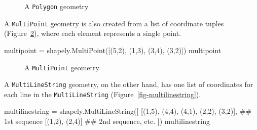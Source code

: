 \documentclass[
  letterpaper,
]{krantz}
\newenvironment{Shaded}{\begin{snugshade}}{\end{snugshade}}
\newcommand{\CommentTok}[1]{\textcolor[rgb]{0.37,0.37,0.37}{#1}}
\newcommand{\DecValTok}[1]{\textcolor[rgb]{0.68,0.00,0.00}{#1}}
\newcommand{\NormalTok}[1]{\textcolor[rgb]{0.00,0.23,0.31}{#1}}
\newcommand{\OperatorTok}[1]{\textcolor[rgb]{0.37,0.37,0.37}{#1}}
\begin{document}
\begin{figure}[H]


\caption{\label{fig-polygon}A \texttt{Polygon} geometry}

\end{figure}%

A \texttt{\textquotesingle{}MultiPoint\textquotesingle{}} geometry is
also created from a list of coordinate tuples
(Figure~\ref{fig-multipoint}), where each element represents a single
point.

\begin{Shaded}
\begin{Highlighting}[]
\NormalTok{multipoint }\OperatorTok{=}\NormalTok{ shapely.MultiPoint([(}\DecValTok{5}\NormalTok{,}\DecValTok{2}\NormalTok{), (}\DecValTok{1}\NormalTok{,}\DecValTok{3}\NormalTok{), (}\DecValTok{3}\NormalTok{,}\DecValTok{4}\NormalTok{), (}\DecValTok{3}\NormalTok{,}\DecValTok{2}\NormalTok{)])}
\NormalTok{multipoint}
\end{Highlighting}
\end{Shaded}

\begin{figure}[H]


\caption{\label{fig-multipoint}A \texttt{MultiPoint} geometry}

\end{figure}%

A \texttt{\textquotesingle{}MultiLineString\textquotesingle{}} geometry,
on the other hand, has one list of coordinates for each line in the
\texttt{MultiLineString} (Figure~\ref{fig-multilinestring}).

\begin{Shaded}
\begin{Highlighting}[]
\NormalTok{multilinestring }\OperatorTok{=}\NormalTok{ shapely.MultiLineString([}
\NormalTok{    [(}\DecValTok{1}\NormalTok{,}\DecValTok{5}\NormalTok{), (}\DecValTok{4}\NormalTok{,}\DecValTok{4}\NormalTok{), (}\DecValTok{4}\NormalTok{,}\DecValTok{1}\NormalTok{), (}\DecValTok{2}\NormalTok{,}\DecValTok{2}\NormalTok{), (}\DecValTok{3}\NormalTok{,}\DecValTok{2}\NormalTok{)],  }\CommentTok{\#\# 1st sequence}
\NormalTok{    [(}\DecValTok{1}\NormalTok{,}\DecValTok{2}\NormalTok{), (}\DecValTok{2}\NormalTok{,}\DecValTok{4}\NormalTok{)]  }\CommentTok{\#\# 2nd sequence, etc.}
\NormalTok{])}
\NormalTok{multilinestring}
\end{Highlighting}
\end{Shaded}
\end{document}
